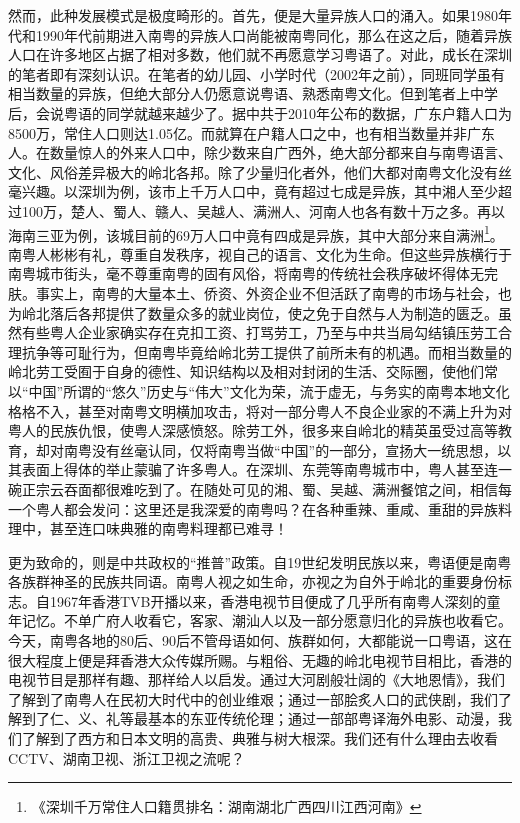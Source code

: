 然而，此种发展模式是极度畸形的。首先，便是大量异族人口的涌入。如果1980年代和1990年代前期进入南粤的异族人口尚能被南粤同化，那么在这之后，随着异族人口在许多地区占据了相对多数，他们就不再愿意学习粤语了。对此，成长在深圳的笔者即有深刻认识。在笔者的幼儿园、小学时代（2002年之前），同班同学虽有相当数量的异族，但绝大部分人仍愿意说粤语、熟悉南粤文化。但到笔者上中学后，会说粤语的同学就越来越少了。据中共于2010年公布的数据，广东户籍人口为8500万，常住人口则达1.05亿。而就算在户籍人口之中，也有相当数量并非广东人。在数量惊人的外来人口中，除少数来自广西外，绝大部分都来自与南粤语言、文化、风俗差异极大的岭北各邦。除了少量归化者外，他们大都对南粤文化没有丝毫兴趣。以深圳为例，该市上千万人口中，竟有超过七成是异族，其中湘人至少超过100万，楚人、蜀人、赣人、吴越人、满洲人、河南人也各有数十万之多。再以海南三亚为例，该城目前的69万人口中竟有四成是异族，其中大部分来自满洲\footnote{《深圳千万常住人口籍贯排名：湖南湖北广西四川江西河南》}。南粤人彬彬有礼，尊重自发秩序，视自己的语言、文化为生命。但这些异族横行于南粤城市街头，毫不尊重南粤的固有风俗，将南粤的传统社会秩序破坏得体无完肤。事实上，南粤的大量本土、侨资、外资企业不但活跃了南粤的市场与社会，也为岭北落后各邦提供了数量众多的就业岗位，使之免于自然与人为制造的匮乏。虽然有些粤人企业家确实存在克扣工资、打骂劳工，乃至与中共当局勾结镇压劳工合理抗争等可耻行为，但南粤毕竟给岭北劳工提供了前所未有的机遇。而相当数量的岭北劳工受囿于自身的德性、知识结构以及相对封闭的生活、交际圈，使他们常以“中国”所谓的“悠久”历史与“伟大”文化为荣，流于虚无，与务实的南粤本地文化格格不入，甚至对南粤文明横加攻击，将对一部分粤人不良企业家的不满上升为对粤人的民族仇恨，使粤人深感愤怒。除劳工外，很多来自岭北的精英虽受过高等教育，却对南粤没有丝毫认同，仅将南粤当做“中国”的一部分，宣扬大一统思想，以其表面上得体的举止蒙骗了许多粤人。在深圳、东莞等南粤城市中，粤人甚至连一碗正宗云吞面都很难吃到了。在随处可见的湘、蜀、吴越、满洲餐馆之间，相信每一个粤人都会发问：这里还是我深爱的南粤吗？在各种重辣、重咸、重甜的异族料理中，甚至连口味典雅的南粤料理都已难寻！

更为致命的，则是中共政权的“推普”政策。自19世纪发明民族以来，粤语便是南粤各族群神圣的民族共同语。南粤人视之如生命，亦视之为自外于岭北的重要身份标志。自1967年香港TVB开播以来，香港电视节目便成了几乎所有南粤人深刻的童年记忆。不单广府人收看它，客家、潮汕人以及一部分愿意归化的异族也收看它。今天，南粤各地的80后、90后不管母语如何、族群如何，大都能说一口粤语，这在很大程度上便是拜香港大众传媒所赐。与粗俗、无趣的岭北电视节目相比，香港的电视节目是那样有趣、那样给人以启发。通过大河剧般壮阔的《大地恩情》，我们了解到了南粤人在民初大时代中的创业维艰；通过一部脍炙人口的武侠剧，我们了解到了仁、义、礼等最基本的东亚传统伦理；通过一部部粤译海外电影、动漫，我们了解到了西方和日本文明的高贵、典雅与树大根深。我们还有什么理由去收看CCTV、湖南卫视、浙江卫视之流呢？

